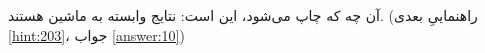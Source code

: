\section{}
\paragraph{}\label{hint:170}
آن چه که چاپ می‌شود، این است:
\LTR\noindent
{}
\RTL
نتایج وابسته به ماشین هستند. (راهنماییِ بعدی \ref{hint:203}، جواب \ref{answer:10})